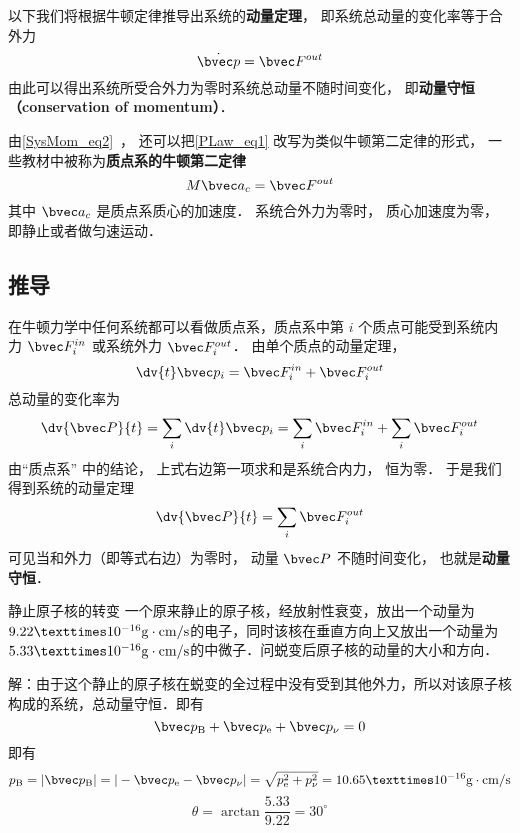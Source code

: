 
以下我们将根据牛顿定律推导出系统的\textbf{动量定理}， 即系统总动量的变化率等于合外力
\begin{equation}\label{PLaw_eq1}
\dot {\bvec p} = \bvec F^{out}
\end{equation}
由此可以得出系统所受合外力为零时系统总动量不随时间变化， 即\textbf{动量守恒（conservation of momentum）}．

由\autoref{SysMom_eq2}~， 还可以把\autoref{PLaw_eq1} 改写为类似牛顿第二定律的形式， 一些教材中被称为\textbf{质点系的牛顿第二定律}
\begin{equation}\label{PLaw_eq2}
M \bvec a_c = \bvec F^{out}
\end{equation}
其中 $\bvec a_c$ 是质点系质心的加速度． 系统合外力为零时， 质心加速度为零， 即静止或者做匀速运动．

\subsection{推导}
在牛顿力学中任何系统都可以看做质点系，质点系中第 $i$ 个质点可能受到系统内力 $\bvec F_i^{in}$ 或系统外力 $\bvec F_i^{out}$． 由单个质点的动量定理，
\begin{equation}
\dv{t} \bvec p_i = \bvec F_i^{in} + \bvec F_i^{out}
\end{equation}
总动量的变化率为
\begin{equation}
\dv{\bvec P}{t} = \sum_i \dv{t} \bvec p_i  = \sum_i \bvec F_i^{in}  + \sum_i \bvec F_i^{out}
\end{equation}
由“质点系” 中的结论， 上式右边第一项求和是系统合内力， 恒为零． 于是我们得到系统的动量定理
\begin{equation}
\dv{\bvec P}{t} = \sum_i \bvec F_i^{out}
\end{equation}
可见当和外力（即等式右边）为零时， 动量 $\bvec P$ 不随时间变化， 也就是\textbf{动量守恒}．

\begin{example}{静止原子核的转变}
一个原来静止的原子核，经放射性衰变，放出一个动量为$9.22×10^{-16}{\rm g\cdot cm/s}$的电子，同时该核在垂直方向上又放出一个动量为$5.33×10^{-16}{\rm g\cdot cm/s}$的中微子．问蜕变后原子核的动量的大小和方向．

解：由于这个静止的原子核在蜕变的全过程中没有受到其他外力，所以对该原子核构成的系统，总动量守恒．即有
\begin{equation}
\bvec p_{\rm B}+\bvec p_{\rm e}+\bvec p_{\rm \nu}=0
\end{equation}
即有
\begin{equation}
p_{\rm B}=|\bvec p_{\rm B}|=|-\bvec p_{\rm e}-\bvec p_{\rm \nu}|=\sqrt{p_{\rm e}^{2}+p_{\rm \nu}^{2}}=10.65×10^{-16}{\rm g\cdot cm/s}
\end{equation}
\begin{equation}
\theta=\arctan\frac{5.33}{9.22}=30^\circ
\end{equation}
\end{example}
